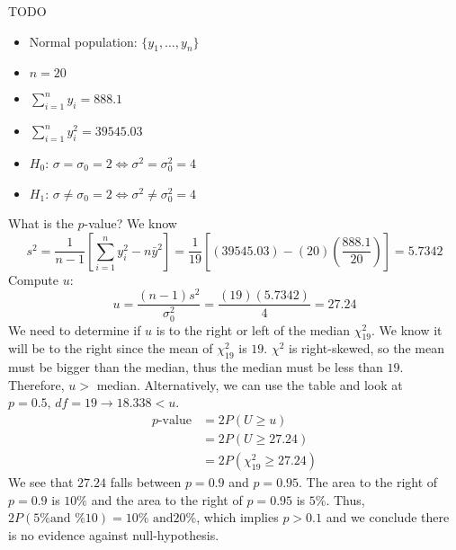 \begin{Example}{TODO}{}
    \begin{itemize}
        \item Normal population: $ \{y_1,\ldots ,y_n\} $
        \item $ n=20 $
        \item $ \sum\limits_{i=1}^{n} y_i=888.1 $
        \item $ \sum\limits_{i=1}^{n} y_i^2=39545.03 $
        \item $ H_0 $: $ \sigma=\sigma_0=2 \iff \sigma^2=\sigma_0^2=4 $
        \item $ H_1 $: $ \sigma\neq \sigma_0=2 \iff \sigma^2\neq \sigma_0^2=4 $
    \end{itemize}
    What is the $ p $-value?
    We know
    \[ s^2=\frac{1}{n-1} \left[ \sum\limits_{i=1}^{n} y_i^2-n\bar{y}^2 \right]
        =
        \frac{1}{19} \left[ (39545.03)-(20)\left( \frac{888.1}{20}  \right)  \right]
        =
        5.7342 \]
    Compute $ u $:
    \[ u=\frac{(n-1)s^2}{\sigma_0^2}
        =
        \frac{(19)(5.7342)}{4}
        =
        27.24 \]
    We need to determine if $ u $ is to the right or left of the median $ \chi^2_{19} $.
    We know it will be to the right since the mean of $ \chi^2_{19} $ is $ 19 $.
    $ \chi^2 $ is right-skewed, so the mean must be bigger than the median,
    thus the median must be less than $ 19 $. Therefore, $ u> $ median. Alternatively,
    we can use the table and look at $ p=0.5,\,df=19\rightarrow 18.338<u $.
    \begin{align*}
        p\text{-value}
         & =2P(U\geqslant u)               \\
         & =2P(U\geqslant 27.24)           \\
         & =2P(\chi^2_{19}\geqslant 27.24)
    \end{align*}
    We see that $ 27.24 $ falls between $ p=0.9 $ and $ p=0.95 $. The area to the right of
    $ p=0.9 $ is $ 10\% $ and the area to the right of $ p=0.95 $ is $ 5\% $.
    Thus, $ 2P(5\%\text{and }\% 10)=10\%\text{ and} 20\% $,
    which implies $ p>0.1 $ and we conclude there is no evidence against null-hypothesis.
\end{Example}

